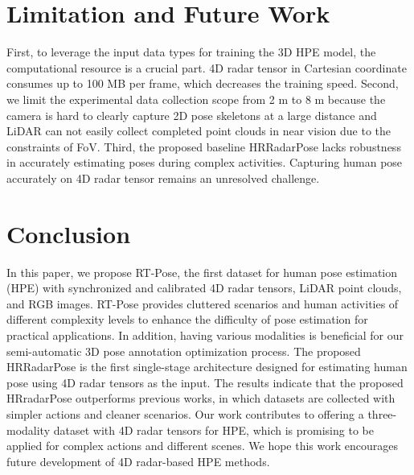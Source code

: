 \section{Limitation and Future Work}
First, to leverage the input data types for training the 3D HPE model, the computational resource is a crucial part. 4D radar tensor in Cartesian coordinate consumes up to 100 MB per frame, which  decreases the training speed. 
Second, we limit the experimental data collection scope from 2 m to 8 m because the camera is hard to clearly capture 2D pose skeletons at a large distance and LiDAR can not easily collect completed point clouds in near vision due to the constraints of FoV.
Third, the proposed baseline HRRadarPose lacks robustness in accurately estimating poses during complex activities. Capturing human pose accurately on 4D radar tensor remains an unresolved challenge.

\section{Conclusion}
In this paper, we propose RT-Pose, the first dataset for human pose estimation (HPE) with synchronized and calibrated 4D radar tensors, LiDAR point clouds, and RGB images. 
RT-Pose provides cluttered scenarios and human activities of different complexity levels to enhance the difficulty of pose estimation for practical applications. In addition, having various modalities is beneficial for our semi-automatic 3D pose annotation optimization process. The proposed HRRadarPose is the first single-stage architecture designed for estimating human pose using 4D radar tensors as the input. The results indicate that the proposed HRradarPose outperforms previous works, in which datasets are collected with simpler actions and cleaner scenarios. Our work contributes to offering a three-modality dataset with 4D radar tensors for HPE, which is promising to be applied for complex actions and different scenes. 
We hope this work encourages future development of 4D radar-based HPE methods. 
\clearpage